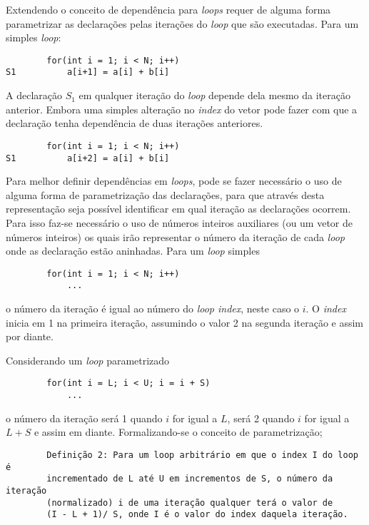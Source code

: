 Extendendo o conceito de dependência para \textit{loops} requer de alguma forma 
parametrizar as declarações pelas iterações do \textit{loop} que são
executadas.
Para um simples \textit{loop}:

\begin{verbatim}
        for(int i = 1; i < N; i++)
S1          a[i+1] = a[i] + b[i]
\end{verbatim}

A declaração $S_1$ em qualquer iteração do \textit{loop} depende dela mesmo da
iteração anterior. Embora uma simples alteração no \textit{index} do vetor pode
fazer com que a declaração tenha dependência de duas iterações anteriores.

\begin{verbatim}
        for(int i = 1; i < N; i++)
S1          a[i+2] = a[i] + b[i]
\end{verbatim}

Para melhor definir dependências em \textit{loops},  pode se fazer necessário o
uso de alguma forma de parametrização das declarações, para que através desta
representação seja possível identificar em qual iteração as declarações ocorrem.
Para isso faz-se necessário o uso de números inteiros auxiliares (ou um vetor de
números inteiros) os quais irão representar o número da iteração de cada 
\textit{loop} onde as declaração estão aninhadas.
Para um \textit{loop} simples

\begin{verbatim}
        for(int i = 1; i < N; i++)
            ...
\end{verbatim}

o número da iteração é igual ao número do \textit{loop index}, neste caso o $i$.
O \textit{index} inicia em 1 na primeira iteração, assumindo o valor 2 na
segunda iteração e assim por diante.

Considerando um \textit{loop} parametrizado

\begin{verbatim}
        for(int i = L; i < U; i = i + S)
            ...
\end{verbatim}

o número da iteração será 1 quando $i$ for igual a $L$, será 2 quando $i$ for
igual a $L+S$ e assim em diante. 
Formalizando-se o conceito de parametrização;

\begin{verbatim}
        Definição 2: Para um loop arbitrário em que o index I do loop é
        incrementado de L até U em incrementos de S, o número da iteração
        (normalizado) i de uma iteração qualquer terá o valor de 
        (I - L + 1)/ S, onde I é o valor do index daquela iteração.
\end{verbatim}

